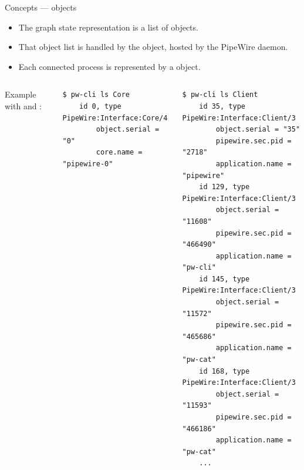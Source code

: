 \begin{frame}[fragile]{Concepts — objects}

  \begin{itemize}
  \item The graph state representation is a list of objects.
  \item That object list is handled by the  object, hosted
    by the PipeWire daemon.
  \item Each connected process is represented by a  object.
  \end{itemize}

  \begin{columns}

      Example with  and
      :

      \begin{block}{}
        \fontsize{7}{7}\selectfont
          \begin{verbatim}
$ pw-cli ls Core
    id 0, type PipeWire:Interface:Core/4
        object.serial = "0"
        core.name = "pipewire-0"
          \end{verbatim}
        \end{block}

      \begin{block}{}
        \fontsize{7}{7}\selectfont
          \begin{verbatim}
$ pw-cli ls Client
    id 35, type PipeWire:Interface:Client/3
        object.serial = "35"
        pipewire.sec.pid = "2718"
        application.name = "pipewire"
    id 129, type PipeWire:Interface:Client/3
        object.serial = "11608"
        pipewire.sec.pid = "466490"
        application.name = "pw-cli"
    id 145, type PipeWire:Interface:Client/3
        object.serial = "11572"
        pipewire.sec.pid = "465686"
        application.name = "pw-cat"
    id 168, type PipeWire:Interface:Client/3
        object.serial = "11593"
        pipewire.sec.pid = "466186"
        application.name = "pw-cat"
    ...
          \end{verbatim}
        \end{block}

  \end{columns}
\end{frame}



